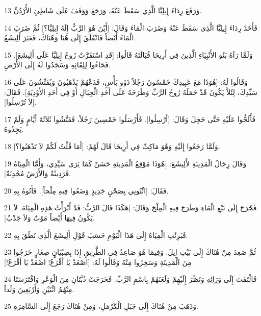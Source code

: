 \par 13 وَرَفَعَ رِدَاءَ إِيلِيَّا الَّذِي سَقَطَ عَنْهُ، وَرَجَعَ وَوَقَفَ عَلَى شَاطِئِ الأُرْدُنِّ.
\par 14 فَأَخَذَ رِدَاءَ إِيلِيَّا الَّذِي سَقَطَ عَنْهُ وَضَرَبَ الْمَاءَ وَقَالَ: [أَيْنَ هُوَ الرَّبُّ إِلَهُ إِيلِيَّا؟] ثُمَّ ضَرَبَ الْمَاءَ أَيْضاً فَانْفَلَقَ إِلَى هُنَا وَهُنَاكَ، فَعَبَرَ أَلِيشَعُ.
\par 15 وَلَمَّا رَآهُ بَنُو الأَنْبِيَاءِ الَّذِينَ فِي أَرِيحَا قُبَالَتَهُ قَالُوا: [قَدِ اسْتَقَرَّتْ رُوحُ إِيلِيَّا عَلَى أَلِيشَعَ]. فَجَاءُوا لِلِقَائِهِ وَسَجَدُوا لَهُ إِلَى الأَرْضِ.
\par 16 وَقَالُوا لَهُ: [هُوَذَا مَعَ عَبِيدِكَ خَمْسُونَ رَجُلاً ذَوُو بَأْسٍ، فَدَعْهُمْ يَذْهَبُونَ وَيُفَتِّشُونَ عَلَى سَيِّدِكَ، لِئَلاَّ يَكُونَ قَدْ حَمَلَهُ رُوحُ الرَّبِّ وَطَرَحَهُ عَلَى أَحَدِ الْجِبَالِ أَوْ فِي أَحَدِ الأَوْدِيَةِ]. فَقَالَ: [لاَ تُرْسِلُوا].
\par 17 فَأَلَحُّوا عَلَيْهِ حَتَّى خَجِلَ وَقَالَ: [أَرْسِلُوا]. فَأَرْسَلُوا خَمْسِينَ رَجُلاً، فَفَتَّشُوا ثَلاَثَةَ أَيَّامٍ وَلَمْ يَجِدُوهُ.
\par 18 وَلَمَّا رَجَعُوا إِلَيْهِ وَهُوَ مَاكِثٌ فِي أَرِيحَا قَالَ لَهُمْ: [أَمَا قُلْتُ لَكُمْ لاَ تَذْهَبُوا؟].
\par 19 وَقَالَ رِجَالُ الْمَدِينَةِ لأَلِيشَعَ: [هُوَذَا مَوْقِعُ الْمَدِينَةِ حَسَنٌ كَمَا يَرَى سَيِّدِي، وَأَمَّا الْمِيَاهُ فَرَدِيئَةٌ وَالأَرْضُ مُجْدِبَةٌ].
\par 20 فَقَالَ: [ائْتُونِي بِصَحْنٍ جَدِيدٍ وَضَعُوا فِيهِ مِلْحاً]. فَأَتُوهُ بِهِ.
\par 21 فَخَرَجَ إِلَى نَبْعِ الْمَاءِ وَطَرَحَ فِيهِ الْمِلْحَ وَقَالَ: [هَكَذَا قَالَ الرَّبُّ: قَدْ أَبْرَأْتُ هَذِهِ الْمِيَاهَ. لاَ يَكُونُ فِيهَا أَيْضاً مَوْتٌ وَلاَ جَدْبٌ].
\par 22 فَبَرِئَتِ الْمِيَاهُ إِلَى هَذَا الْيَوْمِ حَسَبَ قَوْلِ أَلِيشَعَ الَّذِي نَطَقَ بِهِ.
\par 23 ثُمَّ صَعِدَ مِنْ هُنَاكَ إِلَى بَيْتِ إِيلَ. وَفِيمَا هُوَ صَاعِدٌ فِي الطَّرِيقِ إِذَا بِصِبْيَانٍ صِغَارٍ خَرَجُوا مِنَ الْمَدِينَةِ وَسَخِرُوا مِنْهُ وَقَالُوا لَهُ: [اصْعَدْ يَا أَقْرَعُ! اصْعَدْ يَا أَقْرَعُ!]
\par 24 فَالْتَفَتَ إِلَى وَرَائِهِ وَنَظَرَ إِلَيْهِمْ وَلَعَنَهُمْ بِاسْمِ الرَّبِّ. فَخَرَجَتْ دُبَّتَانِ مِنَ الْوَعْرِ وَافْتَرَسَتَا مِنْهُمُ اثْنَيْنِ وَأَرْبَعِينَ وَلَداً.
\par 25 وَذَهَبَ مِنْ هُنَاكَ إِلَى جَبَلِ الْكَرْمَلِ، وَمِنْ هُنَاكَ رَجَعَ إِلَى السَّامِرَةِ.

